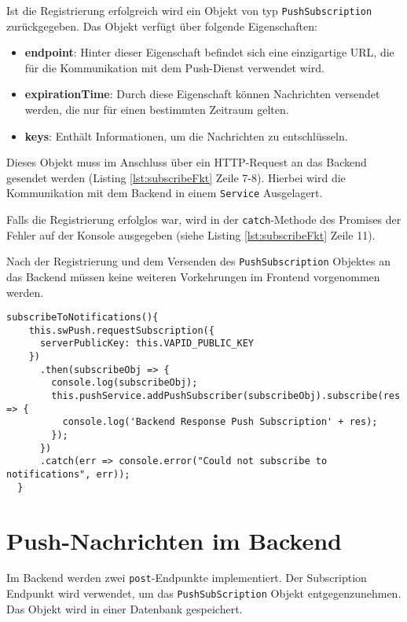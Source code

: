 Ist die Registrierung erfolgreich wird ein Objekt von typ \texttt{PushSubscription} zurückgegeben. 
Das Objekt verfügt über folgende Eigenschaften: 
\begin{itemize}
    \item \textbf{endpoint}: Hinter dieser Eigenschaft befindet sich eine einzigartige URL, die für die Kommunikation mit dem Push-Dienst verwendet wird. 
    \item \textbf{expirationTime}: Durch diese Eigenschaft können Nachrichten versendet werden, die nur für einen bestimmten Zeitraum gelten. 
    \item \textbf{keys}: Enthält Informationen, um die Nachrichten zu entschlüsseln. 
\end{itemize}
Dieses Objekt muss im Anschluss über ein HTTP-Request an das Backend gesendet werden (Listing \ref{lst:subscribeFkt} Zeile 7-8). Hierbei wird die Kommunikation mit dem Backend in einem \texttt{Service} Ausgelagert. 

Falls die Registrierung erfolglos war, wird in der \texttt{catch}-Methode des Promises der Fehler auf der Konsole ausgegeben (siehe Listing \ref{lst:subscribeFkt} Zeile 11). 

Nach der Registrierung und dem Versenden des \texttt{PushSubscription} Objektes an das Backend müssen keine weiteren Vorkehrungen im Frontend vorgenommen werden. 

\begin{lstlisting}[caption={Funktion zur Registrierung beim Push-Dienst},label = lst:subscribeFkt,  float=!htb]
subscribeToNotifications(){
    this.swPush.requestSubscription({
      serverPublicKey: this.VAPID_PUBLIC_KEY
    })
      .then(subscribeObj => {
        console.log(subscribeObj);
        this.pushService.addPushSubscriber(subscribeObj).subscribe(res => {
          console.log('Backend Response Push Subscription' + res);
        });
      })
      .catch(err => console.error("Could not subscribe to notifications", err));
  }
\end{lstlisting}

\newpage
\section{Push-Nachrichten im Backend}

Im Backend werden zwei \texttt{post}-Endpunkte implementiert. Der Subscription Endpunkt wird verwendet, um das \texttt{PushSubScription} Objekt entgegenzunehmen. Das Objekt wird in einer Datenbank gespeichert. 

